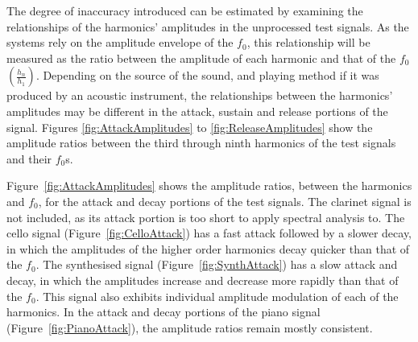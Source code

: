 			The degree of inaccuracy introduced can be estimated by examining the relationships of the
			harmonics' amplitudes in the unprocessed test signals. As the systems rely on the amplitude
			envelope of the $f_{0}$, this relationship will be measured as the ratio between the amplitude of
			each harmonic and that of the $f_{0}$ $\left(\frac{h_{n}}{h_{1}}\right)$. Depending on the source
			of the sound, and playing method if it was produced by an acoustic instrument, the relationships
			between the harmonics' amplitudes may be different in the attack, sustain and release portions of
			the signal. Figures \ref{fig:AttackAmplitudes} to \ref{fig:ReleaseAmplitudes} show the amplitude
			ratios between the third through ninth harmonics of the test signals and their $f_{0}$s.


			Figure~\ref{fig:AttackAmplitudes} shows the amplitude ratios, between the harmonics and $f_{0}$,
			for the attack and decay portions of the test signals. The clarinet signal is not included, as its
			attack portion is too short to apply spectral analysis to. The cello signal
			(Figure~\ref{fig:CelloAttack}) has a fast attack followed by a slower decay, in which the
			amplitudes of the higher order harmonics decay quicker than that of the $f_{0}$. The synthesised
			signal (Figure~\ref{fig:SynthAttack}) has a slow attack and decay, in which the amplitudes increase
			and decrease more rapidly than that of the $f_{0}$. This signal also exhibits individual amplitude
			modulation of each of the harmonics. In the attack and decay portions of the piano signal
			(Figure~\ref{fig:PianoAttack}), the amplitude ratios remain mostly consistent.

